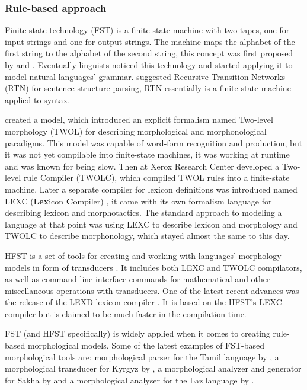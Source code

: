 \subsubsection{Rule-based approach}
\par Finite-state technology (FST) is a finite-state machine with two tapes, one for input strings and one for output strings. The machine maps the alphabet of the first string to the alphabet of the second string, this concept was first proposed by \textcite{mealy_method_1955} and \textcite{moore_gedanken_1955}. Eventually linguists noticed this technology and started applying it to model natural languages' grammar. \textcite{woods_trans_1970} suggested Recursive Transition Networks (RTN) for sentence structure parsing, RTN essentially is a finite-state machine applied to syntax. 
\par \textcite{koskenniemi_twol_1983} created a model, which introduced an explicit formalism named Two-level morphology (TWOL) for describing morphological and morphonological paradigms. This model was capable of word-form recognition and production, but it was not yet compilable into finite-state machines, it was working at runtime and was known for being slow. Then \textcite{karttunen_twolc_1987} at Xerox Research Center developed a Two-level rule Compiler (TWOLC), which compiled TWOL rules into a finite-state machine. Later a separate compiler for lexicon definitions was introduced named LEXC (\textbf{Lex}icon \textbf{C}ompiler) \parencite{karttunen_lexc_1993}, it came with its own formalism language for describing lexicon and morphotactics. The standard approach to modeling a language at that point was using LEXC to describe lexicon and morphology and TWOLC to describe morphonology, which stayed almost the same to this day. 
\par HFST is a set of tools for creating and working with languages' morphology models in form of transducers \parencite{linden_hfst_2009}. It includes both LEXC and TWOLC compilators, as well as command line interface commands for mathematical and other miscellaneous operations with transducers. One of the latest recent advances was the release of the LEXD lexicon compiler \parencite{swanson_lexd_2021}. It is based on the HFST's LEXC compiler but is claimed to be much faster in the compilation time.
\par FST (and HFST specifically) is widely applied when it comes to creating rule-based morphological models. Some of the latest examples of FST-based morphological tools are: morphological parser for the Tamil language by \textcite{sarveswaran_morph_2021}, a morphological transducer for Kyrgyz by \textcite{washington_finite_2012}, a morphological analyzer and generator for Sakha by \textcite{ivanova_free_2022} and a morphological analyser for the Laz language by \textcite{onal_building_2019}.
